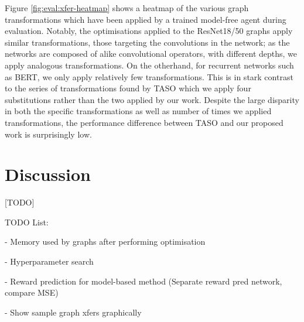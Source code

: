 Figure \ref{fig:eval:xfer-heatmap} shows a heatmap of the various graph transformations which have been applied by a trained model-free agent during evaluation. Notably, the optimisations applied to the ResNet18/50 graphs apply similar transformations, those targeting the convolutions in the network; as the networks are composed of alike convolutional operators, with different depths, we apply analogous transformations. On the otherhand, for recurrent networks such as BERT, we only apply relatively few transformations. This is in stark contrast to the series of transformations found by TASO which we apply four substitutions rather than the two applied by our work. Despite the large disparity in both the specific transformations as well as number of times we applied transformations, the performance difference between TASO and our proposed work is surprisingly low.

\section{Discussion}
[TODO]


TODO List:

- Memory used by graphs after performing optimisation

- Hyperparameter search

- Reward prediction for model-based method (Separate reward pred network, compare MSE)

- Show sample graph xfers graphically

